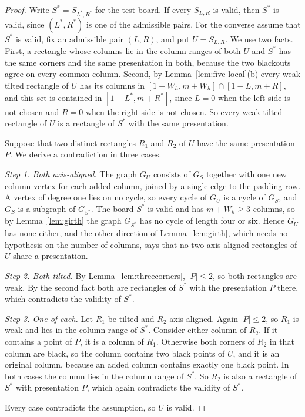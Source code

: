 \begin{proof}
Write $S^*=S_{L^*,R^*}$ for the test board. If every $S_{L,R}$ is valid, then $S^*$ is
valid, since $(L^*,R^*)$ is one of the admissible pairs. For the converse assume that $S^*$
is valid, fix an admissible pair $(L,R)$, and put $U=S_{L,R}$. We use two facts. First, a
rectangle whose columns lie in the column ranges of both $U$ and $S^*$ has the same corners
and the same presentation in both, because the two blackouts agree on every common column.
Second, by Lemma~\ref{lem:five-local}(b) every weak tilted rectangle of $U$ has its columns
in $[1-W_h,m+W_h]\cap[1-L,m+R]$, and this set is contained in $[1-L^*,m+R^*]$, since
$L=0$ when the left side is not chosen and $R=0$ when the right side is not chosen. So every
weak tilted rectangle of $U$ is a rectangle of $S^*$ with the same presentation.

Suppose that two distinct rectangles $R_1$ and $R_2$ of $U$ have the same presentation $P$.
We derive a contradiction in three cases.

\emph{Step 1. Both axis-aligned.} The graph $G_U$ consists of $G_S$ together with one new
column vertex for each added column, joined by a single edge to the padding row. A vertex of
degree one lies on no cycle, so every cycle of $G_U$ is a cycle of $G_S$, and $G_S$ is a
subgraph of $G_{S^*}$. The board $S^*$ is valid and has $m+W_h\ge3$ columns, so by
Lemma~\ref{lem:girth} the graph $G_{S^*}$ has no cycle of length four or six. Hence $G_U$
has none either, and the other direction of Lemma~\ref{lem:girth}, which needs no hypothesis
on the number of columns, says that no two axis-aligned rectangles of $U$ share a
presentation.

\emph{Step 2. Both tilted.} By Lemma~\ref{lem:threecorners}, $|P|\le2$, so both rectangles
are weak. By the second fact both are rectangles of $S^*$ with the presentation $P$ there,
which contradicts the validity of $S^*$.

\emph{Step 3. One of each.} Let $R_1$ be tilted and $R_2$ axis-aligned. Again $|P|\le2$,
so $R_1$ is weak and lies in the column range of $S^*$. Consider either column of $R_2$. If
it contains a point of $P$, it is a column of $R_1$. Otherwise both corners of $R_2$ in that
column are black, so the column contains two black points of $U$, and it is an original
column, because an added column contains exactly one black point. In both cases the column
lies in the column range of $S^*$. So $R_2$ is also a rectangle of $S^*$ with presentation
$P$, which again contradicts the validity of $S^*$.

Every case contradicts the assumption, so $U$ is valid.
\end{proof}

